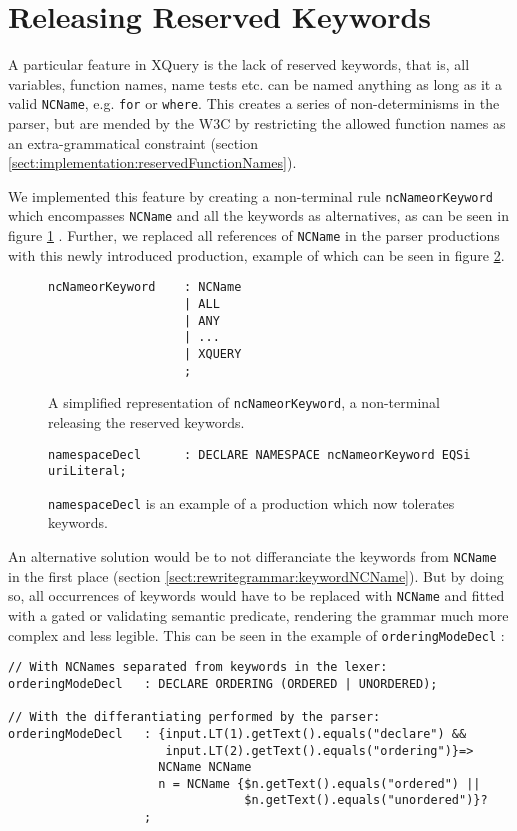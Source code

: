\section{Releasing Reserved Keywords}
\label{sect:impl:reserved_keywords}
A particular feature in XQuery is the lack of reserved keywords, that is, all variables, function names, name tests etc. can be named anything as long as it a valid \verb!NCName!, e.g. \verb!for! or \verb!where!. This creates a series of non-determinisms in the parser, but are mended by the W3C by restricting the allowed function names as an extra-grammatical constraint (section \ref{sect:implementation:reservedFunctionNames}).

We implemented this feature by creating a non-terminal rule \verb!ncNameorKeyword! which encompasses \verb!NCName! and all the keywords as alternatives, as can be seen in figure \ref{fig:ncnNameorKeyword} . Further, we replaced all references of \verb!NCName! in the parser productions with this newly introduced production, example of which can be seen in figure \ref{fig:namespaceDeclKeywordfree}.

\begin{figure}[h!]
\begin{verbatim}
ncNameorKeyword    : NCName
                   | ALL
                   | ANY
                   | ...
                   | XQUERY
                   ;
\end{verbatim}
\label{fig:ncnNameorKeyword}
\caption[\texttt{ncNameorKeyword} releases the reserved keywords]{A simplified representation of \texttt{ncNameorKeyword}, a non-terminal releasing the reserved keywords.}
\end{figure}

\begin{figure}[h!]
\begin{verbatim}
namespaceDecl      : DECLARE NAMESPACE ncNameorKeyword EQSi uriLiteral;
\end{verbatim}
\label{fig:namespaceDeclKeywordfree}
\caption[Example of a production permitting keywords]{\texttt{namespaceDecl} is an example of a production which now tolerates keywords.}
\end{figure}

An alternative solution would be to not differanciate the keywords from \verb!NCName! in the first place (section \ref{sect:rewritegrammar:keywordNCName}). But by doing so, all occurrences of keywords would have to be replaced with \verb!NCName! and fitted with a gated or validating semantic predicate, rendering the grammar much more complex and less legible. This can be seen in the example of \verb!orderingModeDecl! :
\begin{verbatim}
// With NCNames separated from keywords in the lexer:
orderingModeDecl   : DECLARE ORDERING (ORDERED | UNORDERED);

// With the differantiating performed by the parser:
orderingModeDecl   : {input.LT(1).getText().equals("declare") && 
                      input.LT(2).getText().equals("ordering")}=>
                     NCName NCName
                     n = NCName {$n.getText().equals("ordered") || 
                                 $n.getText().equals("unordered")}?
                   ;
\end{verbatim}

